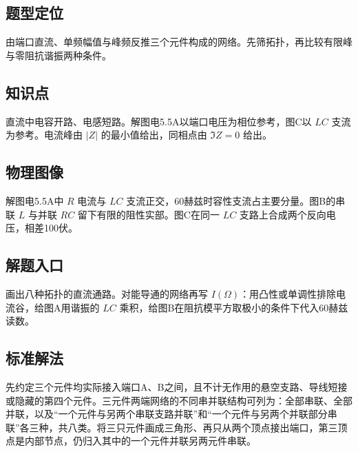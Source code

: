 \documentclass[UTF8,fontset=fandol,a4paper,11pt]{ctexart}
\begin{document}


\subsection*{题型定位}

由端口直流、单频幅值与峰频反推三个元件构成的网络。先筛拓扑，再比较有限峰与零阻抗谐振两种条件。



\subsection*{知识点}

直流中电容开路、电感短路。解图电5.5A以端口电压为相位参考，图C以 $LC$ 支流为参考。电流峰由 $|Z|$ 的最小值给出，同相点由 $\Im Z=0$ 给出。



\subsection*{物理图像}

解图电5.5A中 $R$ 电流与 $LC$ 支流正交，60赫兹时容性支流占主要分量。图B的串联 $L$ 与并联 $RC$ 留下有限的阻性实部。图C在同一 $LC$ 支路上合成两个反向电压，相差100伏。



\subsection*{解题入口}

画出八种拓扑的直流通路。对能导通的网络再写 $I(\Omega)$：用凸性或单调性排除电流谷，给图A用谐振的 $LC$ 乘积，给图B在阻抗模平方取极小的条件下代入60赫兹读数。


\subsection*{标准解法}


先约定三个元件均实际接入端口A、B之间，且不计无作用的悬空支路、导线短接或隐藏的第四个元件。三元件两端网络的不同串并联结构可列为：全部串联、全部并联，以及“一个元件与另两个串联支路并联”和“一个元件与另两个并联部分串联”各三种，共八类。将三只元件画成三角形、再只从两个顶点接出端口，第三顶点是内部节点，仍归入其中的一个元件并联另两元件串联。
\end{document}
